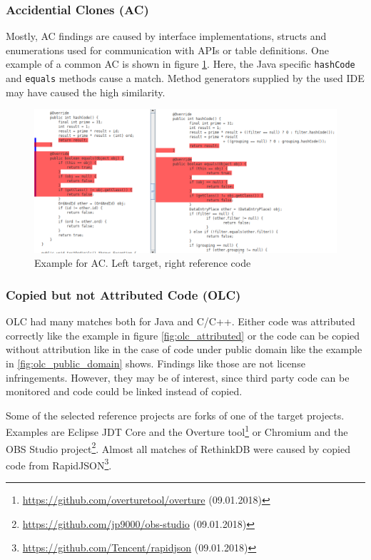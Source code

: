 \subsubsection*{Accidential Clones (AC)}
Mostly, AC findings are caused by interface implementations, structs and enumerations used for communication with APIs or table definitions.
One example of a common AC is shown in figure \ref{fig:ac}.
Here, the Java specific \texttt{hashCode} and \texttt{equals} methods cause a match.
Method generators supplied by the used IDE may have caused the high similarity.
\begin{figure}[htpb]
	\centering
	\includegraphics[width=\linewidth]{figures/ac.png}
	\caption{Example for AC. Left target, right reference code}\label{fig:ac}
\end{figure}

\newpage
\subsubsection*{Copied but not Attributed Code (OLC)}
OLC had many matches both for Java and C/C++.
Either code was attributed correctly like the example in figure \ref{fig:olc_attributed} or the code can be copied without attribution like in the case of code under public domain like the example in \ref{fig:olc_public_domain} shows.
Findings like those are not license infringements.
However, they may be of interest, since third party code can be monitored and code could be linked instead of copied.

Some of the selected reference projects are forks of one of the target projects.
Examples are Eclipse JDT Core and the Overture tool\footnote{\href{https://github.com/overturetool/overture}{https://github.com/overturetool/overture} (09.01.2018)} or Chromium and the OBS Studio project\footnote{\href{https://github.com/jp9000/obs-studio}{https://github.com/jp9000/obs-studio} (09.01.2018)}.
Almost all matches of RethinkDB were caused by copied code from RapidJSON\footnote{\href{https://github.com/Tencent/rapidjson}{https://github.com/Tencent/rapidjson} (09.01.2018)}.

